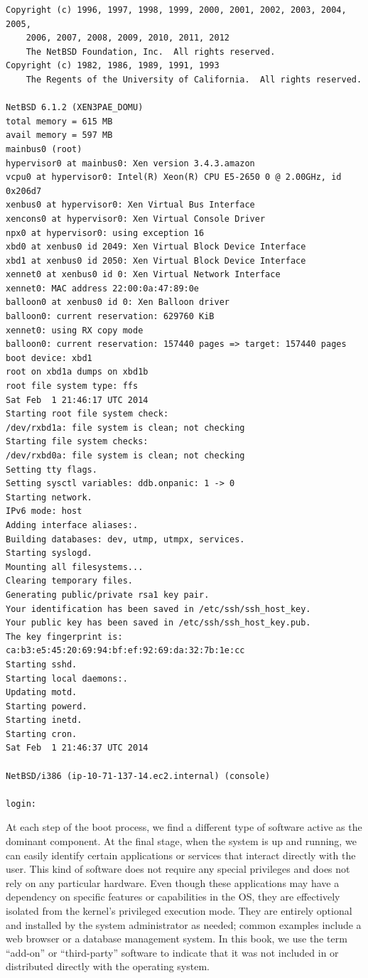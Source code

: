 \begin{lstlisting}[float,basicstyle=\scriptsize,label=code:nbsdboot2,caption={Excerpt
of the boot messages of a NetBSD system}]
Copyright (c) 1996, 1997, 1998, 1999, 2000, 2001, 2002, 2003, 2004, 2005,
    2006, 2007, 2008, 2009, 2010, 2011, 2012
    The NetBSD Foundation, Inc.  All rights reserved.
Copyright (c) 1982, 1986, 1989, 1991, 1993
    The Regents of the University of California.  All rights reserved.

NetBSD 6.1.2 (XEN3PAE_DOMU)
total memory = 615 MB
avail memory = 597 MB
mainbus0 (root)
hypervisor0 at mainbus0: Xen version 3.4.3.amazon
vcpu0 at hypervisor0: Intel(R) Xeon(R) CPU E5-2650 0 @ 2.00GHz, id 0x206d7
xenbus0 at hypervisor0: Xen Virtual Bus Interface
xencons0 at hypervisor0: Xen Virtual Console Driver
npx0 at hypervisor0: using exception 16
xbd0 at xenbus0 id 2049: Xen Virtual Block Device Interface
xbd1 at xenbus0 id 2050: Xen Virtual Block Device Interface
xennet0 at xenbus0 id 0: Xen Virtual Network Interface
xennet0: MAC address 22:00:0a:47:89:0e
balloon0 at xenbus0 id 0: Xen Balloon driver
balloon0: current reservation: 629760 KiB
xennet0: using RX copy mode
balloon0: current reservation: 157440 pages => target: 157440 pages
boot device: xbd1
root on xbd1a dumps on xbd1b
root file system type: ffs
Sat Feb  1 21:46:17 UTC 2014
Starting root file system check:
/dev/rxbd1a: file system is clean; not checking
Starting file system checks:
/dev/rxbd0a: file system is clean; not checking
Setting tty flags.
Setting sysctl variables: ddb.onpanic: 1 -> 0
Starting network.
IPv6 mode: host
Adding interface aliases:.
Building databases: dev, utmp, utmpx, services.
Starting syslogd.
Mounting all filesystems...
Clearing temporary files.
Generating public/private rsa1 key pair.
Your identification has been saved in /etc/ssh/ssh_host_key.
Your public key has been saved in /etc/ssh/ssh_host_key.pub.
The key fingerprint is: ca:b3:e5:45:20:69:94:bf:ef:92:69:da:32:7b:1e:cc
Starting sshd.
Starting local daemons:.
Updating motd.
Starting powerd.
Starting inetd.
Starting cron.
Sat Feb  1 21:46:37 UTC 2014

NetBSD/i386 (ip-10-71-137-14.ec2.internal) (console)

login:
\end{lstlisting}

At each step of the boot process, we find a different
type of software active as the dominant component.  At
the final stage, when the system is up and running, we
can easily identify certain applications or services
that interact directly with the user.  This kind of
software does not require any special privileges and
does not rely on any particular hardware.  Even
though these applications may have a dependency on
specific features or capabilities in the OS, they are
effectively isolated from the kernel's privileged
execution mode.  They are entirely optional and
installed by the system administrator as needed;
common examples include a web browser or a database
management system.  In this book, we use the term
``add-on'' or ``third-party''
software
to indicate that it was not included in or
distributed directly with the operating system.

